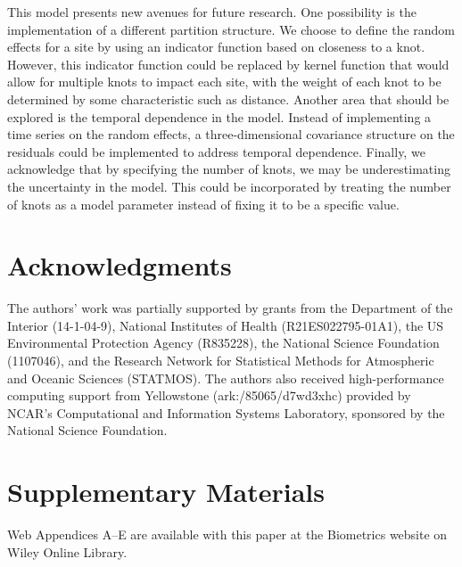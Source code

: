 \documentclass[useAMS,usenatbib,referee]{biom}
\begin{document}
This model presents new avenues for future research.
One possibility is the implementation of a different partition structure.
We choose to define the random effects for a site by using an indicator function based on closeness to a knot.
However, this indicator function could be replaced by kernel function that would allow for multiple knots to impact each site, with the weight of each knot to be determined by some characteristic such as distance.
Another area that should be explored is the temporal dependence in the model.
Instead of implementing a time series on the random effects, a three-dimensional covariance structure on the residuals could be implemented to address temporal dependence.
Finally, we acknowledge that by specifying the number of knots, we may be underestimating the uncertainty in the model.
This could be incorporated by treating the number of knots as a model parameter instead of fixing it to be a specific value.

\backmatter

\section*{Acknowledgments}
The authors' work was partially supported by grants from the Department of the Interior (14-1-04-9), National Institutes of Health (R21ES022795-01A1), the US Environmental Protection Agency (R835228), the National Science Foundation (1107046), and the Research Network for Statistical Methods for Atmospheric and Oceanic Sciences (STATMOS).
The authors also received high-performance computing support from Yellowstone (ark:/85065/d7wd3xhc) provided by NCAR's Computational and Information Systems Laboratory, sponsored by the National Science Foundation.

\section*{Supplementary Materials}
Web Appendices A--E are available with this paper at the Biometrics website on Wiley Online Library. \vspace*{-8pt}





\label{lastpage}
\end{document}
